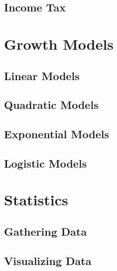 \documentclass[9pt,letter,twoside,openright,fleqn]{memoir}
\begin{document}
\section{Income Tax}

\vfill
\pagebreak

\chapter{Growth Models}
\vfill
\pagebreak

\section{Linear Models}

\pagebreak

\section{Quadratic Models}

\pagebreak

\section{Exponential Models}

\pagebreak

\section{Logistic Models}

\vfill
\pagebreak

\chapter{Statistics}
\vfill
\pagebreak

\section{Gathering Data}

\pagebreak

\section{Visualizing Data}

\pagebreak
\end{document}
